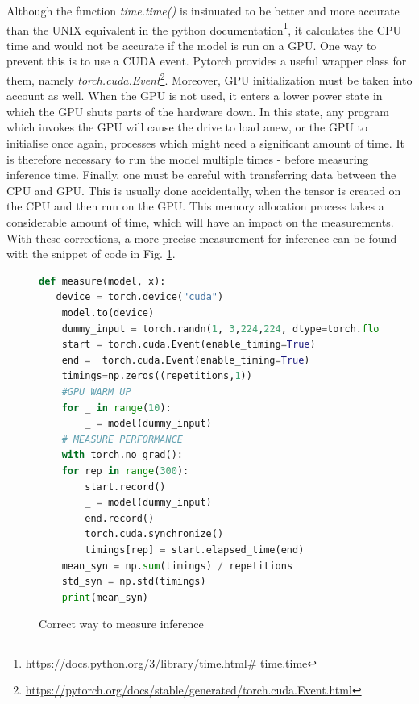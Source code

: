 Although the function \textit{time.time()} is insinuated to be better and more accurate than the UNIX equivalent in the python documentation\footnote{ \url{https://docs.python.org/3/library/time.html\# time.time} }, it calculates the CPU time and would not be accurate if the model is run on a GPU. One way to prevent this is to use a CUDA event. Pytorch provides a useful wrapper class for them, namely \textit{torch.cuda.Event}\footnote{ \url{https://pytorch.org/docs/stable/generated/torch.cuda.Event.html} }. Moreover, GPU initialization must be taken into account as well. When the GPU is not used, it enters a lower power state in which the GPU shuts parts of the hardware down. In this state, any program which invokes the GPU will cause the drive to load anew, or the GPU to initialise once again, processes which might need a significant amount of time. It is therefore necessary to run the model multiple times - before measuring inference time. \cite{Correct_inference_measure}
Finally, one must be careful with transferring data between the CPU and GPU. This is usually done accidentally, when the tensor is created on the CPU and then run on the GPU. This memory allocation process takes a considerable amount of time, which will have an impact on the measurements. \cite{Correct_inference_measure}
With these corrections, a more precise measurement for inference can be found with the snippet of code in Fig. \ref{fig:corr_inf}.\\
\begin{figure}[h]
\begin{lstlisting}[language=python]
def measure(model, x):
   device = torch.device("cuda")
    model.to(device)
    dummy_input = torch.randn(1, 3,224,224, dtype=torch.float).to(device)
    start = torch.cuda.Event(enable_timing=True)
    end =  torch.cuda.Event(enable_timing=True)
    timings=np.zeros((repetitions,1))
    #GPU WARM UP
    for _ in range(10):
        _ = model(dummy_input)
    # MEASURE PERFORMANCE
    with torch.no_grad():
    for rep in range(300):
        start.record()
        _ = model(dummy_input)
        end.record()
        torch.cuda.synchronize()
        timings[rep] = start.elapsed_time(end)
    mean_syn = np.sum(timings) / repetitions
    std_syn = np.std(timings)
    print(mean_syn)

\end{lstlisting}
\caption{Correct way to measure inference}
\label{fig:corr_inf}
\end{figure}

